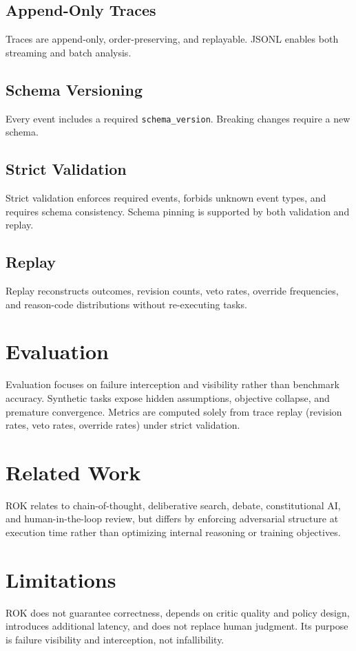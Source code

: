 \documentclass[11pt]{article}
\begin{document}
\subsection{Append-Only Traces}
Traces are append-only, order-preserving, and replayable. JSONL enables both streaming and batch analysis.

\subsection{Schema Versioning}
Every event includes a required \texttt{schema\_version}. Breaking changes require a new schema.

\subsection{Strict Validation}
Strict validation enforces required events, forbids unknown event types, and requires schema consistency. Schema pinning is supported by both validation and replay.

\subsection{Replay}
Replay reconstructs outcomes, revision counts, veto rates, override frequencies, and reason-code distributions without re-executing tasks.

\section{Evaluation}
Evaluation focuses on failure interception and visibility rather than benchmark accuracy. Synthetic tasks expose hidden assumptions, objective collapse, and premature convergence. Metrics are computed solely from trace replay (revision rates, veto rates, override rates) under strict validation.

\section{Related Work}
ROK relates to chain-of-thought, deliberative search, debate, constitutional AI, and human-in-the-loop review, but differs by enforcing adversarial structure at execution time rather than optimizing internal reasoning or training objectives.

\section{Limitations}
ROK does not guarantee correctness, depends on critic quality and policy design, introduces additional latency, and does not replace human judgment. Its purpose is failure visibility and interception, not infallibility.
\end{document}
